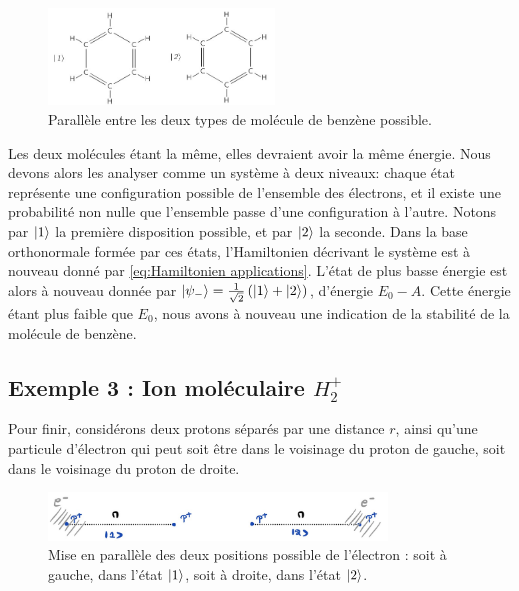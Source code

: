 \documentclass[../notesdecours.tex]{subfiles}
\begin{document}
\begin{figure}[h]
    \centering
    \includegraphics[width=6cm,scale=0.5]{Chapitre 5/Figure 4.jpg}
    \caption{Parallèle entre les deux types de molécule de benzène possible.}
    \label{fig:symmetrie benzene}
\end{figure}

Les deux molécules étant la même, elles devraient avoir la même énergie. Nous devons alors les analyser comme un système à deux  niveaux: chaque état représente une configuration possible de l'ensemble des électrons, et il existe une probabilité non nulle que l'ensemble passe d'une configuration à l'autre. \color{black}Notons par $\ket{1}$ la première disposition possible, et par $\ket{2}$ la seconde. Dans la base orthonormale formée par ces états, l'Hamiltonien décrivant le système est à nouveau donné par \eqref{eq:Hamiltonien applications}. L'état de plus basse énergie est alors à nouveau donnée par $\ket{\psi_-} = \frac{1}{\sqrt{2}}\left(\ket{1}+\ket{2}\right)$, d'énergie $E_0-A$. Cette énergie étant plus faible que $E_0$, nous avons à nouveau une indication de la stabilité de la molécule de benzène.

\subsection*{Exemple 3 : Ion moléculaire $H_2^+$}

Pour finir, considérons deux protons séparés par une distance $r$, ainsi qu'une particule d'électron qui peut soit être dans le voisinage du proton de gauche, soit dans le voisinage du proton de droite.\\

\begin{figure}[h]
    \centering
    \includegraphics[width=9cm,scale=0.9]{Chapitre 5/Figure 5.jpg}
    \caption{Mise en parallèle des deux positions possible de l'électron : soit à gauche, dans l'état $\ket{1}$, soit à droite, dans l'état $\ket{2}$.}
\end{figure}
\end{document}
